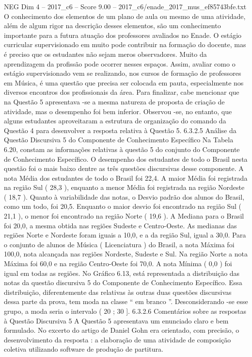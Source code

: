 \begin{textsample}{NEG Dim 4 – 2017\_c6 – Score 9.00 – 2017\_c6/enade\_2017\_mus\_ef85743bfe.txt}
O conhecimento dos elementos de um plano de aula ou mesmo de uma atividade, além de algum rigor na descrição desses elementos, são um conhecimento importante para a futura atuação dos professores avaliados no Enade.
O estágio curricular supervisionado em muito pode contribuir na formação do docente, mas é preciso que os estudantes não sejam meros observadores.
Muito da aprendizagem da profissão pode ocorrer nesses espaços.
Assim, avaliar como o estágio supervisionado vem se realizando, nos cursos de formação de professores em Música, é uma questão que precisa ser colocada em pauta, especialmente nos diversos encontros dos profissionais da área.
Para finalizar, cabe mencionar que na Questão 5 apresentava -se a mesma natureza de proposta de criação de atividade, mas o desempenho foi bem inferior.
Observou -se, no entanto, que alguns estudantes aproveitaram a estrutura de organização do comando da Questão 4 para desenvolver a resposta relativa à Questão 5. 6.3.2.5 Análise da Questão Discursiva 5 do Componente de Conhecimento Específico Na Tabela 6.20, constam as informações relativas à questão 5 do conjunto do Componente de Conhecimento Específico.
O desempenho dos estudantes de todo o Brasil nesta questão foi o mais baixo dentre as três questões discursivas desse componente.
A nota Média dos estudantes de todo o Brasil foi 22,4.
A maior Média foi registrada na região Sul ( 28,3 ), enquanto a menor Média foi registrada na região Nordeste ( 18,7 ).
Quanto à variabilidade das notas, o Desvio padrão dos alunos do Brasil, como um todo, foi 20,5.
Enquanto o maior desvio foi encontrado na região Sul ( 21,1 ), o menor foi encontrado na região Norte ( 19,6 ).
A Mediana para o Brasil foi 20,0, a mesma obtida nas regiões Sudeste e Centro-Oeste.
As medianas das regiões Norte e Nordeste foram iguais a 10,0, e a da região Sul, igual a 30,0.
Para o conjunto de alunos de Música ( Licenciatura ) do Brasil, a nota Máxima foi 100,0, nota alcançada nas regiões Nordeste, Sudeste e Sul.
Na região Norte a nota Máxima foi 60,0 e na região Centro-Oeste foi 70,0.
A nota Mínima ( 0,0 ) foi igual em todas as regiões.
No Gráfico 6.13, está representada a distribuição das notas da questão discursiva 5 do Componente de Conhecimento Específico.
Essa distribuição, diferentemente das relativas às outras duas questões discursivas dessa parte da prova, tem moda na classe “ em branco ”.
Desconsiderando -se esse grupo, a moda seria o intervalo ( 20 ; 30 ]. 6.3.2.6 Comentários sobre as respostas à Questão Discursiva 5 A Questão 5 apresentava um enunciado claro e bem formulado.
No excerto do artigo de Daniel Gohn era orientado, com precisão, o desenvolvimento da resposta : a elaboração de uma atividade de composição coletiva utilizando software de produção de partitura.

\end{textsample}
